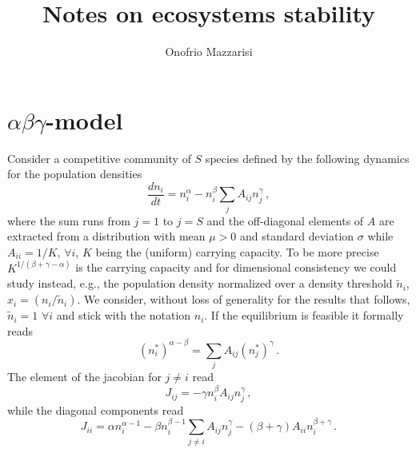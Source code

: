 \documentclass[10pt]{article}
\title{{\bf Notes on ecosystems stability}}
\author{Onofrio Mazzarisi}
\begin{document}


\maketitle

\section{$\alpha\beta\gamma$-model}

Consider a competitive community of $S$ species
defined by the following dynamics for the population densities
\begin{equation}
    \frac{dn_i}{dt}=n_i^{\alpha}-n_i^{\beta}\sum_{j}A_{ij}n_j^{\gamma} \, ,
\end{equation}
where the sum runs from $j=1$ to $j=S$ and the off-diagonal elements
of $A$ are extracted from a distribution
with mean $\mu>0$ and standard deviation $\sigma$ while $A_{ii}=1/K$, $\forall i$,
$K$ being the (uniform) carrying capacity.
To be more precise $K^{1/(\beta+\gamma-\alpha)}$ is the carrying capacity and for
dimensional consistency we could study instead, e.g., the
population density normalized over a density threshold $\tilde{n}_{i}$,
$x_i=(n_i/\tilde{n}_i)$. We consider,
without loss of generality for the results that follows, $\tilde{n}_i = 1$ $\forall i$
and stick with the notation $n_i$.
If the equilibrium is feasible it formally reads
\begin{equation}
    (n_i^*)^{\alpha-\beta} = \sum_{j}A_{ij}(n_j^*)^{\gamma} \, .
\end{equation}
The element of the jacobian for $j\neq i$ read
\begin{equation}
    J_{ij} = -\gamma n_i^{\beta}A_{ij}n_j^{\gamma} \, ,
\end{equation}
while the diagonal components read
\begin{equation}
    J_{ii} = \alpha n_i^{\alpha-1}-\beta n_i^{\beta-1}\sum_{j\neq i}A_{ij}n_j^{\gamma}
    - (\beta+\gamma)A_{ii}n_i^{\beta+\gamma} \, .
\end{equation}
\end{document}
